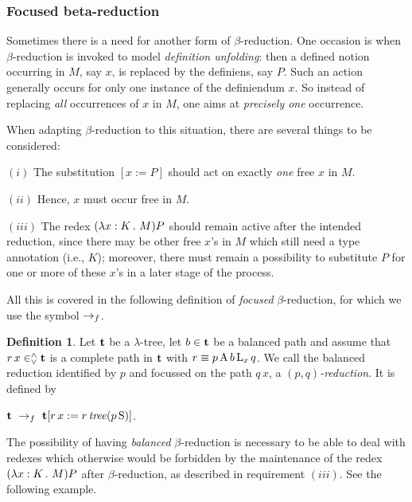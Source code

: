 \documentclass{article}
\theoremstyle{plain}
\theoremstyle{definition}
\newtheorem{Def}[The]{Definition}
\begin{document}
\subsubsection{Focused beta-reduction}

Sometimes there is a need for another form of $\beta$-reduction. One occasion is when $\beta$-reduction is invoked to model {\em definition unfolding\/}: then a defined notion occurring in $M$, say $x$, is replaced by the definiens, say $P$. Such an action generally occurs for only one instance of the definiendum $x$. So instead of replacing {\em all\/} occurrences of $x$ in $M$, one aims at {\em precisely one\/} occurrence.

When adapting $\beta$-reduction to this situation, there are several things to be considered:

\smallskip

$(i)$ The substitution $[x := P]$ should act on exactly {\em one\/} free $x$ in $M$.

$(ii)$ Hence, $x$ must occur free in $M$.

$(iii)$ The redex $(\lambda x : K \, . \,\, M)P$ should remain active after the intended reduction, since there may be other free $x$'s in $M$ which still need a type annotation (i.e., $K$); moreover, there must remain a possibility to substitute $P$ for one or more of these $x$'s in a later stage of the process.


\smallskip

All this is covered in the following definition of {\em focused\/} $\beta$-reduction, for which we use the symbol $\rightarrow_f$.


\begin{Def}
Let ${\bf t}$ be a $\lambda$-tree, let $b \in {\bf t}$ be a balanced path and assume that $r \, x \in^\wedge_\vee {\bf t}$ is a complete path in ${\bf t}$ with $r \equiv p \, {\rm A} \, b \, {\rm L}_x \, q$. We call the balanced reduction identified by $p$ and focussed on the path $q \, x$, a {\em $(p,q)$-reduction\/}. It is defined by

\smallskip

${\bf t} ~\rightarrow_f~ {\bf t}[r \, x := r \, {\it tree\/}(p \, {\rm S})]$.
\end{Def}

The possibility of having {\em balanced\/} $\beta$-reduction is necessary to be able to deal with redexes which otherwise would be forbidden by the maintenance of the redex $(\lambda x : K \, . \,\, M)P$ after $\beta$-reduction, as described in requirement $(iii)$. See the following example.
\end{document}
